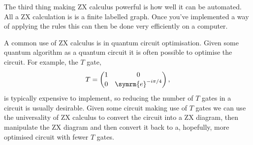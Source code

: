 \documentclass[fleqn]{NotesClass}
\newcommand{\e}{\symrm{e}}
\begin{document}
    The third thing making ZX calculus powerful is how well it can be automated.
    All a ZX calculation is is a finite labelled graph.
    Once you've implemented a way of applying the rules this can then be done very efficiently on a computer.
    
    A common use of ZX calculus is in quantum circuit optimisation.
    Given some quantum algorithm as a quantum circuit it is often possible to optimise the circuit.
    For example, the \(T\) gate,
    \begin{equation}
        T = 
        \begin{pmatrix}
            1 & 0\\
            0 & \e^{-i\pi/4}
        \end{pmatrix}
        ,
    \end{equation}
    is typically expensive to implement, so reducing the number of \(T\) gates in a circuit is usually desirable.
    Given some circuit making use of \(T\) gates we can use the universality of ZX calculus to convert the circuit into a ZX diagram, then manipulate the ZX diagram and then convert it back to a, hopefully, more optimised circuit with fewer \(T\) gates.
    
    
    
    \backmatter
    \printindex
\end{document}
